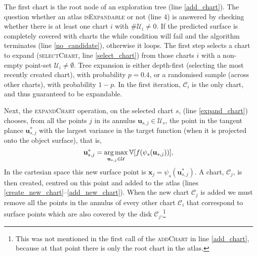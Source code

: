 The first chart is the root node of an exploration tree (line \ref{add_chart}). The question whether an atlas \textsc{isExpandable} or not (line 4) is answered by checking whether there is at least one chart $i$ with $\#\mathcal{U}_i \neq 0$. If the predicted surface is completely covered with charts the while condition will fail and the algorithm terminates (line \ref{no_candidate}), otherwise it loops. The first step selects a chart to expand (\textsc{selectChart}, line \ref{select_chart}) from those charts $i$ with a non-empty point-set $\mathcal{U}_i \neq \emptyset$. Tree expansion is either depth-first (selecting the most recently created chart), with probability $p = 0.4$, or a randomised sample (across other charts), with probability $1-p$. In the first iteration, $\mathcal{C}_i$ is the only chart, and thus guaranteed to be expandable. 

Next, the \textsc{expandChart} operation, on the selected chart $s$, (line \ref{expand_chart}) chooses, from all the points $j$ in its annulus $\mathbf{u}_{s,j} \in \mathcal{U}_s$, the point in the tangent plance $\mathbf{u}^*_{s,j}$ with the largest variance in the target function (when it is projected onto the object surface), that is,
\begin{equation}
\mathbf{u}_{s,j}^* =  \operatorname*{arg\,max}_{\mathbf{u}_{s,j} \in \mathcal{U}} \mathbb{V}[f(\psi_s(\mathbf{u}_{s,j}))], 
\end{equation}
In the cartesian space this new surface point is $\mathbf{x}_j = \psi_s(\mathbf{u}_{s,j}^*)$. A chart, $\mathcal{C}_j$, is then created, centred on this point and added to the atlas (lines \ref{create_new_chart}--\ref{add_new_chart}). When the new chart $\mathcal{C}_j$ is added we must remove all the points in the annulus of every other chart $\mathcal{C}_i$ that correspond to surface points which are also covered by the disk $\mathcal{C}_j$.\footnote{This was not mentioned in the first call of the \textsc{addChart} in line \ref{add_chart}, because at that point there is only the root chart in the atlas.}

